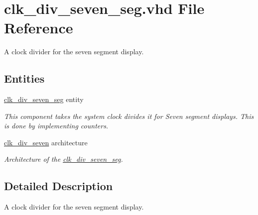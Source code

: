 \hypertarget{clk__div__seven__seg_8vhd}{\section{clk\-\_\-div\-\_\-seven\-\_\-seg.\-vhd File Reference}
\label{clk__div__seven__seg_8vhd}
}


A clock divider for the seven segment display.  


\subsection*{Entities}
\begin{DoxyCompactItemize}
\item 
\hyperlink{classclk__div__seven__seg}{clk\-\_\-div\-\_\-seven\-\_\-seg} entity
\begin{DoxyCompactList}\small\item\em This component takes the system clock divides it for Seven segment displays. This is done by implementing counters. \end{DoxyCompactList}\item 
\hyperlink{classclk__div__seven__seg_1_1clk__div__seven}{clk\-\_\-div\-\_\-seven} architecture
\begin{DoxyCompactList}\small\item\em Architecture of the \hyperlink{classclk__div__seven__seg}{clk\-\_\-div\-\_\-seven\-\_\-seg}. \end{DoxyCompactList}\end{DoxyCompactItemize}


\subsection{Detailed Description}
A clock divider for the seven segment display. 